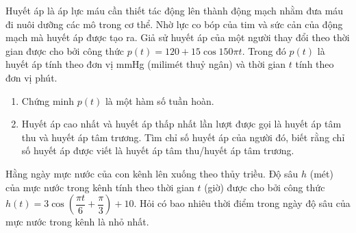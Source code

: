 \begin{ex}%
	Huyết áp là áp lực máu cần thiết tác động lên thành động mạch nhằm đưa máu đi nuôi dưỡng các mô trong cơ thể. Nhờ lực co bóp của tim và sức cản của động mạch mà huyết áp được tạo ra. Giả sử huyết áp của một người thay đổi theo thời gian được cho bởi công  thức $p(t)=120+15\cos150\pi t$. Trong đó $p(t)$ là huyết áp tính theo đơn vị mmHg (milimét thuỷ ngân) và thời gian $t$ tính theo đơn vị phút.
	\begin{enumerate}
		\item Chứng minh $p(t)$ là một hàm số tuần  hoàn.
		\item Huyết áp cao nhất và huyết áp thấp nhất lần lượt được gọi là huyết áp tâm thu và huyết áp tâm trương. Tìm chỉ số huyết áp của người đó, biết rằng chỉ số huyết áp được viết  là huyết áp tâm thu/huyết áp tâm trương.
	\end{enumerate}
\end{ex}

\begin{bt}%
Hằng ngày mực nước của con kênh lên xuống theo thủy triều. Độ sâu $h$ (mét) của mực nước trong kênh tính theo thời gian $t$ (giờ) được cho bởi công thức $h(t)=3\cos\left(\dfrac{\pi t}{6}+\dfrac{\pi}{3}\right)+10$. Hỏi có bao nhiêu thời điểm trong ngày độ sâu của mực nước trong kênh là nhỏ nhất.
\end{bt}

